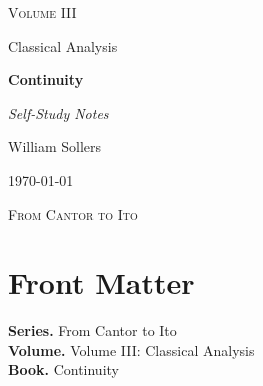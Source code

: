 \documentclass[12pt, a4paper]{report}
\begin{document}
\ExplSyntaxOff
\renewcommand{\familydefault}{\rmdefault}

\begin{titlepage}
\centering
\vspace*{3.5cm}

{\Large\scshape Volume III\par}
\vspace{0.35cm}
{\large Classical Analysis\par}

\vspace{1.4cm}

{\Huge\bfseries Continuity\par}

\vspace{0.6cm}
{\large\itshape Self-Study Notes\par}

\vfill

{\large William Sollers\par}
\vspace{0.35cm}
{\large \today\par}

\vfill

{\large\scshape From Cantor to Ito\par}
\end{titlepage}

\clearpage
\thispagestyle{plain}
\chapter*{Front Matter}
\noindent\textbf{Series.} From Cantor to Ito\\[0.5em]
\textbf{Volume.} Volume III: Classical Analysis\\[0.5em]
\textbf{Book.} Continuity

\clearpage
\tableofcontents
\clearpage
{}



\clearpage



\printindex[tech]
\printindex[dep]
\end{document}
